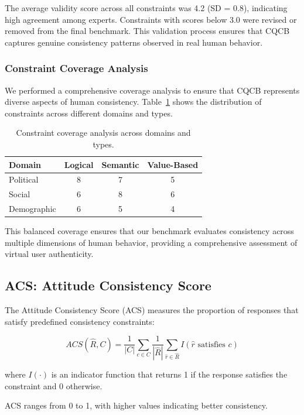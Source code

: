 \documentclass[sigconf, anonymous]{acmart}
\begin{document}
The average validity score across all constraints was 4.2 (SD = 0.8), indicating high agreement among experts. Constraints with scores below 3.0 were revised or removed from the final benchmark. This validation process ensures that CQCB captures genuine consistency patterns observed in real human behavior.

\subsubsection{Constraint Coverage Analysis}

We performed a comprehensive coverage analysis to ensure that CQCB represents diverse aspects of human consistency. Table~\ref{tab:constraint_coverage} shows the distribution of constraints across different domains and types.

\begin{table}[h]
\centering
\caption{Constraint coverage analysis across domains and types.}
\label{tab:constraint_coverage}
\begin{tabular}{lccc}
\toprule
Domain & Logical & Semantic & Value-Based \\
\midrule
Political & 8 & 7 & 5 \\
Social & 6 & 8 & 6 \\
Demographic & 6 & 5 & 4 \\
\bottomrule
\end{tabular}
\end{table}

This balanced coverage ensures that our benchmark evaluates consistency across multiple dimensions of human behavior, providing a comprehensive assessment of virtual user authenticity.

\subsection{ACS: Attitude Consistency Score}

The Attitude Consistency Score (ACS) measures the proportion of responses that satisfy predefined consistency constraints:

\[
ACS(\hat{R}, C) = \frac{1}{|C|} \sum_{c \in C} \frac{1}{|\hat{R}|} \sum_{\hat{r} \in \hat{R}} I(\hat{r} \text{ satisfies } c)
\]

where $I(\cdot)$ is an indicator function that returns 1 if the response satisfies the constraint and 0 otherwise.

ACS ranges from 0 to 1, with higher values indicating better consistency.
\end{document}
